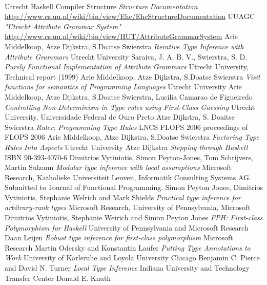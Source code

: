 \documentclass[twoside, titlepage, openright, a4paper]{book}
\newcommand{\onelinecommentchars}{\quad-{}- }
\newcommand{\commentbeginchars}{\enskip\{-}
\newcommand{\commentendchars}{-\}\enskip}
\newcommand{\visiblecomments}{%
  \let\onelinecomment=\onelinecommentchars
  \let\commentbegin=\commentbeginchars
  \let\commentend=\commentendchars}
\begin{document}
\visiblecomments

﻿\begin{thebibliography}{9}
  Utrecht Haskell Compiler Structure
  \emph{Structure Documentation}
   \url{http://www.cs.uu.nl/wiki/bin/view/Ehc/EhcStructureDocumentation}
  UUAGC
  \emph{"Utrecht Attribute Grammar System"}
   \url{http://www.cs.uu.nl/wiki/bin/view/HUT/AttributeGrammarSystem}
  Arie Middelkoop, Atze Dijkstra, S.Doatse Swierstra
  \emph{Iterative Type Inference with Attribute Grammars}
  Utrecht University
  Saraiva, J. A. B. V., Swierstra, S. D.
  \emph{Purely Functional Implementation of Attribute Grammars}
  Utrecht University, Technical report (1999)
  Arie Middelkoop, Atze Dijkstra, S.Doatse Swierstra
  \emph{Visit functions for semantics of Programming Languages}
  Utrecht University
  Arie Middelkoop, Atze Dijkstra, S.Doatse Swierstra, Lucilia Camarao de Figueiredo
  \emph{Controlling Non-Determinism in Type rules using First-Class Guessing}
  Utrecht University, Universidade Federal de Ouro Preto
  Atze Dijkstra, S. Doaitse Swierstra 
  \emph{Ruler: Programming Type Rules}
  LNCS FLOPS 2006 proceedings of FLOPS 2006
  Arie Middelkoop, Atze Dijkstra, S.Doatse Swierstra
  \emph{Factoring Type Rules Into Aspects}
  Utrecht University
  Atze Dijkstra
  \emph{Stepping through Haskell}
  ISBN 90-393-4070-6
  Dimitrios Vytiniotis, Simon Peyton-Jones, Tom Schrijvers, Martin Sulzann
  \emph{Modular type inference with local assumptions}
  Microsoft Research, Katholieke Universiteit Leuven, Informatik Consulting Systems AG.
  Submitted to Journal of Functional Programming.
  Simon Peyton Jones, Dimitrios Vytiniotis, Stephanie Welrich and Mark Shields
  \emph{Practical type inference for arbitrary-rank types}
  Microsoft Research, University of Pennsylvania, Microsoft
  Dimitrios Vytiniotis, Stephanie Weirich and Simon Peyton Jones
  \emph{FPH: First-class Polymorphism for Haskell}
  University of Pennsylvania and Microsoft Research
  Daan Leijen
  \emph{Robust type inference for first-class polymorphism}
  Microsoft Research
  Martin Odersky and Konstantin Laufer
  \emph{Putting Type Annotations to Work}
  University of Karlsruhe and Loyola University Chicago
  Benjamin C. Pierce and David N. Turner
  \emph{Local Type Inference}
  Indiana University and Technology Transfer Center
  Donald E. Knuth

\end{thebibliography}
\end{document}
